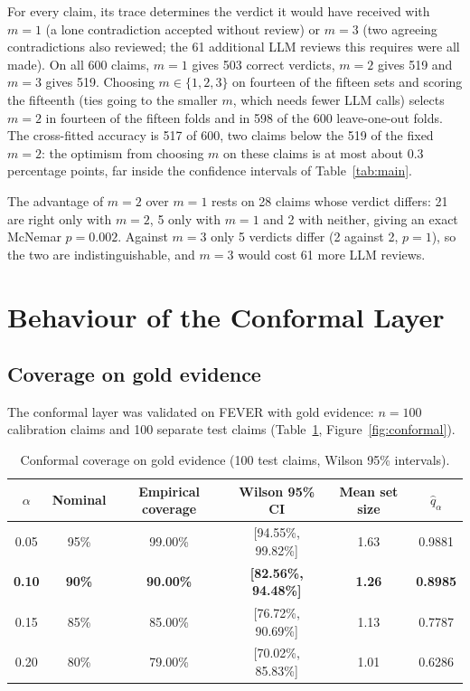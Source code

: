 For every claim, its trace determines the verdict it would have received with $m = 1$ (a lone contradiction accepted without review) or $m = 3$ (two agreeing contradictions also reviewed; the 61 additional LLM reviews this requires were all made). On all 600 claims, $m = 1$ gives 503 correct verdicts, $m = 2$ gives 519 and $m = 3$ gives 519. Choosing $m \in \{1, 2, 3\}$ on fourteen of the fifteen sets and scoring the fifteenth (ties going to the smaller $m$, which needs fewer LLM calls) selects $m = 2$ in fourteen of the fifteen folds and in 598 of the 600 leave-one-out folds. The cross-fitted accuracy is 517 of 600, two claims below the 519 of the fixed $m = 2$: the optimism from choosing $m$ on these claims is at most about 0.3 percentage points, far inside the confidence intervals of Table~\ref{tab:main}.

The advantage of $m = 2$ over $m = 1$ rests on 28 claims whose verdict differs: 21 are right only with $m = 2$, 5 only with $m = 1$ and 2 with neither, giving an exact McNemar $p = 0.002$. Against $m = 3$ only 5 verdicts differ (2 against 2, $p = 1$), so the two are indistinguishable, and $m = 3$ would cost 61 more LLM reviews.

\section{Behaviour of the Conformal Layer}

\subsection{Coverage on gold evidence}

The conformal layer was validated on FEVER with gold evidence: $n = 100$ calibration claims and 100 separate test claims (Table~\ref{tab:conformal}, Figure~\ref{fig:conformal}).

\begin{table}[htbp]
\centering
\caption{Conformal coverage on gold evidence (100 test claims, Wilson 95\% intervals).}
\label{tab:conformal}
\begin{tabular}{@{}cccccc@{}}
\toprule
$\alpha$ & Nominal & Empirical coverage & Wilson 95\% CI & Mean set size & $\hat{q}_\alpha$ \\
\midrule
0.05 & 95\% & 99.00\% & [94.55\%, 99.82\%] & 1.63 & 0.9881 \\
\textbf{0.10} & \textbf{90\%} & \textbf{90.00\%} & \textbf{[82.56\%, 94.48\%]} & \textbf{1.26} & \textbf{0.8985} \\
0.15 & 85\% & 85.00\% & [76.72\%, 90.69\%] & 1.13 & 0.7787 \\
0.20 & 80\% & 79.00\% & [70.02\%, 85.83\%] & 1.01 & 0.6286 \\
\bottomrule
\end{tabular}
\end{table}

